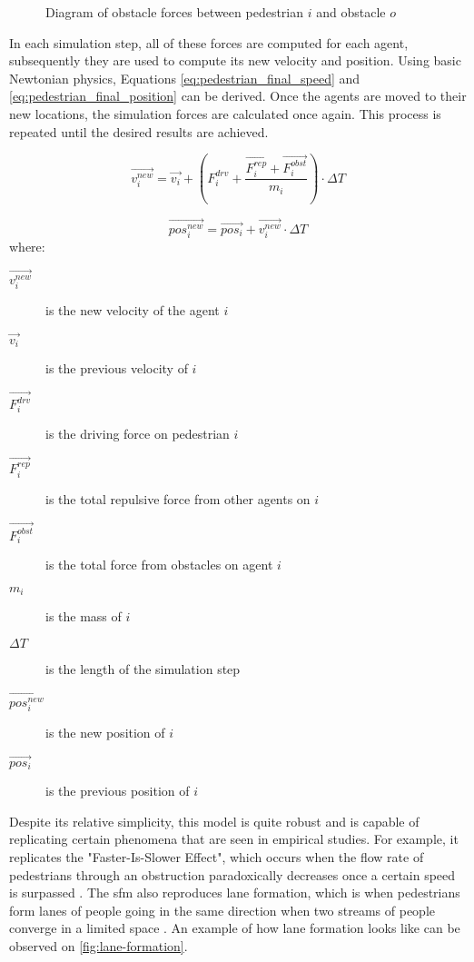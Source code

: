 \documentclass[twoside, 11pt]{article}
\begin{document}
\begin{figure}[h]
  \centering
  
  \caption{Diagram of obstacle forces between pedestrian $i$ and obstacle $o$}
  \label{fig:obstacle-forces}
\end{figure}

In each simulation step, all of these forces are computed for each agent, subsequently they are used to compute its new velocity and position. Using basic Newtonian physics, Equations \eqref{eq:pedestrian_final_speed} and \eqref{eq:pedestrian_final_position} can be derived. Once the agents are moved to their new locations, the simulation forces are calculated once again. This process is repeated until the desired results are achieved.

\begin{equation}
  \vec{v_i^{new}} = \vec{v_i} + ( F_i^{drv} + \frac{\vec{F_i^{rep}} + \vec{F_i^{obst}}}{m_i} ) \cdot \Delta T
  \label{eq:pedestrian_final_speed}
\end{equation}

\begin{equation}
  \vec{pos_i^{new}} = \vec{pos_i} + \vec{v_i^{new}} \cdot \Delta T
  \label{eq:pedestrian_final_position}
\end{equation}
where:
\begin{description}
  \item[$\vec{v_i^{new}}$] is the new velocity of the agent $i$
  \item[$\vec{v_i}$] is the previous velocity of $i$
  \item[$\vec{F_i^{drv}}$] is the driving force on pedestrian $i$
  \item[$\vec{F_i^{rep}}$] is the total repulsive force from other agents on $i$
  \item[$\vec{F_i^{obst}}$] is the total force from obstacles on agent $i$
  \item[$m_i$] is the mass of $i$ 
  \item[$\Delta T$] is the length of the simulation step
  \item[$\vec{pos_i^{new}}$] is the new position of $i$
  \item[$\vec{pos_i}$] is the previous position of $i$
\end{description}

Despite its relative simplicity, this model is quite robust and is capable of replicating certain phenomena that are seen in empirical studies. For example, it replicates the "Faster-Is-Slower Effect", which occurs when the flow rate of pedestrians through an obstruction paradoxically decreases once a certain speed is surpassed \cite{helbingSimulatingDynamicFeatures2000}. The \gls{sfm} also reproduces lane formation, which is when pedestrians form lanes of people going in the same direction when two streams of people converge in a limited space \cite{PhysRevE.94.032304}. An example of how lane formation looks like can be observed on \autoref{fig:lane-formation}.
\end{document}
